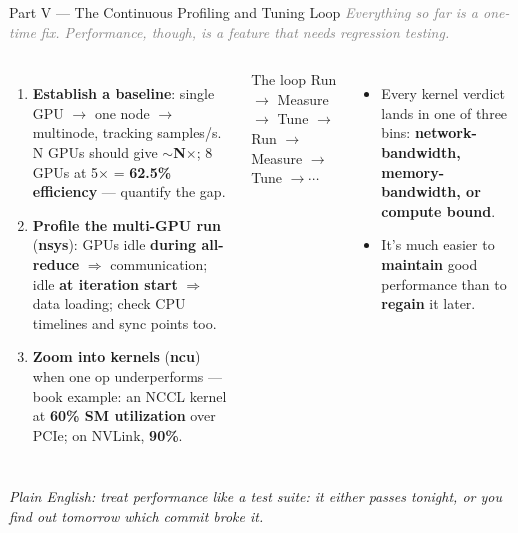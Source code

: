 \documentclass[aspectratio=169]{beamer}
\newcommand{\kw}[1]{\textbf{\textcolor{kwblue}{#1}}}
\newcommand{\pe}[1]{\par{\setlength{\fboxsep}{2.5pt}\noindent\colorbox{navy!9}{\parbox{\dimexpr\textwidth-5pt\relax}{\footnotesize\itshape Plain English: #1}}}}
\newcommand{\bridge}[1]{{\footnotesize\itshape\textcolor{gray}{#1}}\par}
\begin{document}
\begin{frame}{Part V --- The Continuous Profiling and Tuning Loop}
  \bridge{Everything so far is a one-time fix. Performance, though, is a feature that needs regression testing.}
  \begin{columns}[t]
    \begin{enumerate}\small
      \item \kw{Establish a baseline}: single GPU $\to$ one node $\to$ multinode, tracking
            samples/s. N GPUs should give \kw{$\sim$N$\times$}; 8 GPUs at 5$\times$ =
            \kw{62.5\% efficiency} --- quantify the gap.
      \item \kw{Profile the multi-GPU run} (\kw{nsys}): GPUs idle \kw{during all-reduce}
            $\Rightarrow$ communication; idle \kw{at iteration start} $\Rightarrow$ data
            loading; check CPU timelines and sync points too.
      \item \kw{Zoom into kernels} (\kw{ncu}) when one op underperforms --- book example: an
            NCCL kernel at \kw{60\% SM utilization} over PCIe; on NVLink, \kw{90\%}.
    \end{enumerate}
    \begin{block}{The loop}
      \centering\small Run $\to$ Measure $\to$ Tune $\to$ Run $\to$ Measure $\to$ Tune $\to\cdots$
    \end{block}
    \begin{itemize}\small
      \item Every kernel verdict lands in one of three bins: \kw{network-bandwidth,
            memory-bandwidth, or compute bound}.
      \item It's much easier to \kw{maintain} good performance than to \kw{regain} it later.
    \end{itemize}
  \end{columns}
  \pe{treat performance like a test suite: it either passes tonight, or you find out tomorrow which commit broke it.}
\end{frame}
\end{document}
